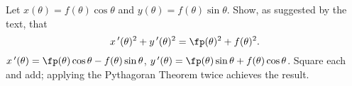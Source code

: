 {Let $x(\theta) = f(\theta)\cos\theta$ and $y(\theta)=f(\theta)\sin\theta$. Show, as suggested by the text, that 
$$x\,'(\theta)^2+y\,'(\theta)^2 = \fp(\theta)^2+f(\theta)^2.$$
}
{$x\,'(\theta) = \fp(\theta)\cos\theta -f(\theta)\sin\theta$, $y\,'(\theta) = \fp(\theta)\sin\theta + f(\theta)\cos\theta$. Square each and add; applying the Pythagoran Theorem twice achieves the result.
}
